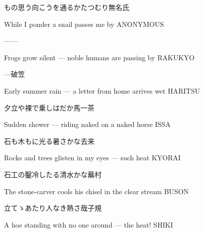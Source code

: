 \begin{haiku}
    {もの思う向こうを通るかたつむり}\hfill{\FH 無名氏}

    \vin{} While I ponder
    \vin{} \vin{} a snail
    \vin{} \vin{} \vin{} passes me by \hspace{\fill} ANONYMOUS
\end{haiku}

\begin{haiku}
    ---\hfill{---}

    \vin{} Frogs grow silent ---
    \vin{} \vin{} noble humans
    \vin{} \vin{} \vin{} are passing by \hspace{\fill} RAKUKYO
\end{haiku}

\begin{haiku}
    {---}\hfill{\FH 破笠}

    \vin{} Early summer rain ---
    \vin{} \vin{} a letter from home
    \vin{} \vin{} \vin{} arrives wet \hspace{\fill} HARITSU
\end{haiku}

\begin{haiku}
    {\FH 夕立や裸で乗しはだか馬}\hfill{\FH 一茶}

    \vin{} Sudden shower ---
    \vin{} \vin{} riding naked
    \vin{} \vin{} \vin{} on a naked horse \hspace{\fill} ISSA
\end{haiku}

\begin{haiku}
    {\FH 石も木もに光る暑さかな}\hfill{\FH 去来}

    \vin{} Rocks and trees
    \vin{} \vin{} glisten in my eyes ---
    \vin{} \vin{} \vin{} such heat \hspace{\fill} KYORAI
\end{haiku}

\begin{haiku}
    {\FH 石工の鑿冷したる清水かな}\hfill{\FH 蕪村}

    \vin{} The stone-carver
    \vin{} \vin{} cools his chisel
    \vin{} \vin{} \vin{} in the clear stream \hspace{\fill} BUSON
\end{haiku}

\begin{haiku}
    {\FH {}立てゝあたり人なき熱さ哉}\hfill{\FH 子規}

    \vin{} A hoe standing
    \vin{} \vin{} with no one around ---
    \vin{} \vin{} \vin{} the heat! \hspace{\fill} SHIKI
\end{haiku}

